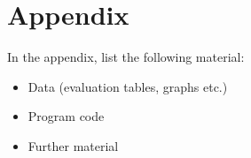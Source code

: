 \section{Appendix}
\label{sec:Appendix}

In the appendix, list the following material:

\begin{itemize}
 \item Data (evaluation tables, graphs etc.)
 \item Program code
 \item Further material
\end{itemize}

